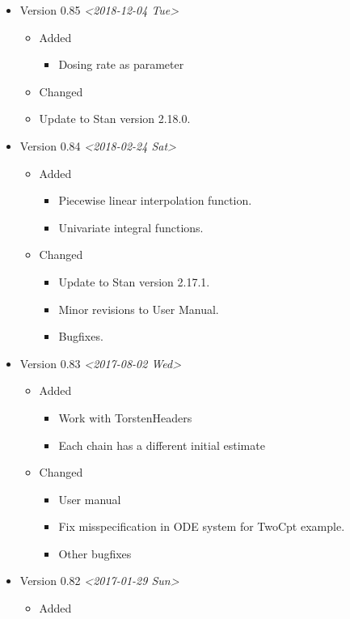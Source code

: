\documentclass[12pt, reqno, oneside]{amsbook}
\numberwithin{equation}{chapter}
\numberwithin{figure}{chapter}
\numberwithin{table}{chapter}
\theoremstyle{remark}
\begin{document}
\begin{itemize}
\item Version 0.85 \textit{<2018-12-04 Tue>}
\begin{itemize}
\item Added
\begin{itemize}
\item Dosing rate as parameter
\end{itemize}
\item Changed
\item Update to Stan version 2.18.0.
\end{itemize}

\item Version 0.84 \textit{<2018-02-24 Sat>}
\begin{itemize}
\item Added
\begin{itemize}
\item Piecewise linear interpolation function.
\item Univariate integral functions.
\end{itemize}
\item Changed
\begin{itemize}
\item Update to Stan version 2.17.1.
\item Minor revisions to User Manual.
\item Bugfixes.
\end{itemize}
\end{itemize}
\item Version 0.83 \textit{<2017-08-02 Wed>}
\begin{itemize}
\item Added
\begin{itemize}
\item Work with TorstenHeaders
\item Each chain has a different initial estimate
\end{itemize}
\item Changed
\begin{itemize}
\item User manual
\item Fix misspecification in ODE system for TwoCpt example.
\item Other bugfixes
\end{itemize}
\end{itemize}
\item Version 0.82 \textit{<2017-01-29 Sun>}
\begin{itemize}
\item Added
\begin{itemize}

\end{itemize}
\end{itemize}
\end{itemize}
\end{document}
